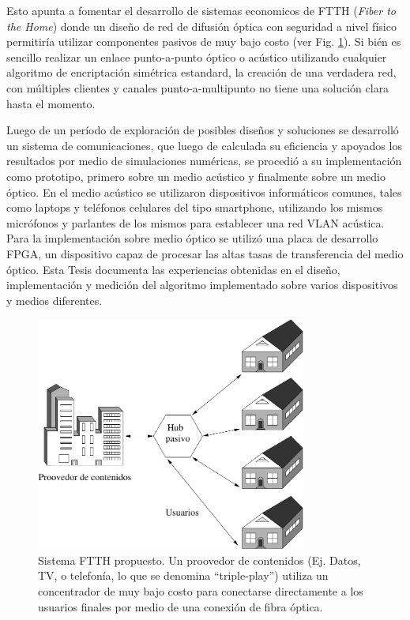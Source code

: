Esto apunta a fomentar el desarrollo de sistemas economicos de FTTH (\textit{Fiber to the Home}) donde un diseño de red de difusión óptica con seguridad a nivel físico permitiría utilizar componentes pasivos de muy bajo costo (ver Fig. \ref{arch:ftth}). Si bién es sencillo realizar un enlace punto-a-punto óptico o acústico utilizando cualquier algoritmo de encriptación simétrica estandard, la creación de una verdadera red, con múltiples clientes y canales punto-a-multipunto no tiene una solución clara hasta el momento.

Luego de un período de exploración de posibles diseños y soluciones se desarrolló un sistema de comunicaciones, que luego de calculada su eficiencia y apoyados los resultados por medio de simulaciones numéricas, se procedió a su implementación como prototipo, primero sobre un medio acústico y finalmente sobre un medio óptico. 
En el medio acústico se utilizaron dispositivos informáticos comunes, tales como laptops y teléfonos celulares del tipo smartphone, utilizando los mismos micrófonos y parlantes de los mismos para establecer una red VLAN acústica. 
Para la implementación sobre medio óptico se utilizó una placa de desarrollo FPGA, un dispositivo capaz de procesar las altas tasas de transferencia del medio óptico.
Esta Tesis documenta las experiencias obtenidas en el diseño, implementación y medición del algoritmo implementado sobre varios dispositivos y medios diferentes.

\begin{figure}[!t]
  \centering
    \includegraphics[width=3.5in]{graphs/ftth.pdf}
    \caption{Sistema FTTH propuesto. Un proovedor de contenidos (Ej. Datos, TV, o telefonía, lo que se denomina ``triple-play'') utiliza un concentrador de muy bajo costo para conectarse directamente a los usuarios finales por medio de una conexión de fibra óptica.}
    \label{arch:ftth}
\end{figure}

